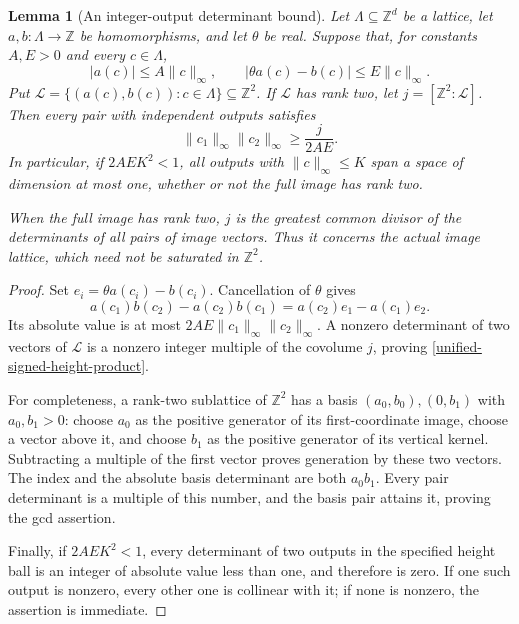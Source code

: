 \documentclass[11pt,a4paper]{article}
\newtheorem{lemma}[theorem]{Lemma}
\theoremstyle{definition}
\theoremstyle{remark}
\begin{document}
\begin{lemma}[An integer-output determinant bound]
\label{unified-signed-determinant-lemma}
Let $\Lambda\subseteq\mathbb Z^d$ be a lattice, let
$a,b:\Lambda\to\mathbb Z$ be homomorphisms, and let $\theta$ be real.
Suppose that, for constants $A,E>0$ and every $c\in\Lambda$,
\[
 |a(c)|\le A\|c\|_\infty,
 \qquad
 |\theta a(c)-b(c)|\le E\|c\|_\infty.
\]
Put $\mathcal L=\{(a(c),b(c)):c\in\Lambda\}\subseteq\mathbb Z^2$.
If $\mathcal L$ has rank two, let
$j=[\mathbb Z^2:\mathcal L]$.  Then every pair with independent
outputs satisfies
\begin{equation}\label{unified-signed-height-product}
 \|c_1\|_\infty\|c_2\|_\infty\ge\frac{j}{2AE}.
\end{equation}
In particular, if $2AEK^2<1$, all outputs with
$\|c\|_\infty\le K$ span a space of dimension at most one,
whether or not the full image has rank two.

When the full image has rank two, $j$ is the greatest common divisor
of the determinants of all pairs of image vectors.  Thus it concerns
the actual image lattice, which need not be saturated in $\mathbb Z^2$.
\end{lemma}

\begin{proof}
Set $e_i=\theta a(c_i)-b(c_i)$.  Cancellation of $\theta$ gives
\[
 a(c_1)b(c_2)-a(c_2)b(c_1)
   =a(c_2)e_1-a(c_1)e_2.
\]
Its absolute value is at most
$2AE\|c_1\|_\infty\|c_2\|_\infty$.
A nonzero determinant of two vectors of $\mathcal L$ is a nonzero
integer multiple of the covolume $j$, proving
\eqref{unified-signed-height-product}.

For completeness, a rank-two sublattice of $\mathbb Z^2$ has a basis
$(a_0,b_0),(0,b_1)$ with $a_0,b_1>0$: choose $a_0$ as the positive
generator of its first-coordinate image, choose a vector above it,
and choose $b_1$ as the positive generator of its vertical kernel.
Subtracting a multiple of the first vector proves generation by these
two vectors.  The index and the absolute basis determinant are both
$a_0b_1$.  Every pair determinant is a multiple of this number, and
the basis pair attains it, proving the gcd assertion.

Finally, if $2AEK^2<1$, every determinant of two outputs in the
specified height ball is an integer of absolute value less than one,
and therefore is zero.  If one such output is nonzero, every other
one is collinear with it; if none is nonzero, the assertion is
immediate.
\end{proof}
\end{document}

